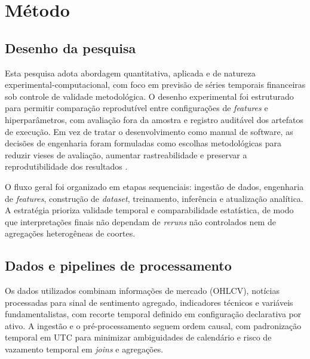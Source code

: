 \chapter{Método}


\section{Desenho da pesquisa}
Esta pesquisa adota abordagem quantitativa, aplicada e de natureza experimental-computacional, com foco em previsão de séries temporais financeiras sob controle de validade metodológica. O desenho experimental foi estruturado para permitir comparação reprodutível entre configurações de \textit{features} e hiperparâmetros, com avaliação fora da amostra e registro auditável dos artefatos de execução. Em vez de tratar o desenvolvimento como manual de software, as decisões de engenharia foram formuladas como escolhas metodológicas para reduzir vieses de avaliação, aumentar rastreabilidade e preservar a reprodutibilidade dos resultados \cite{PINEAU2021REPRODUCIBILITY}.

O fluxo geral foi organizado em etapas sequenciais: ingestão de dados, engenharia de \textit{features}, construção de \textit{dataset}, treinamento, inferência e atualização analítica. A estratégia prioriza validade temporal e comparabilidade estatística, de modo que interpretações finais não dependam de \textit{reruns} não controlados nem de agregações heterogêneas de coortes.

\section{Dados e pipelines de processamento}
Os dados utilizados combinam informações de mercado (OHLCV), notícias processadas para sinal de sentimento agregado, indicadores técnicos e variáveis fundamentalistas, com recorte temporal definido em configuração declarativa por ativo. A ingestão e o pré-processamento seguem ordem causal, com padronização temporal em UTC para minimizar ambiguidades de calendário e risco de vazamento temporal em \textit{joins} e agregações.

